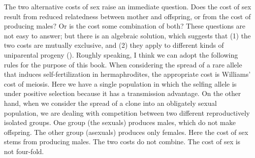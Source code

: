 \documentclass[
  american,
  letterpaper,
]{book}
\begin{document}
The two alternative costs of sex raise an immediate question. Does the
cost of sex result from reduced relatedness between mother and
offspring, or from the cost of producing males? Or is the cost some
combination of both? These questions are not easy to answer; but there
is an algebraic solution, which suggests that (1) the two costs are
mutually exclusive, and (2) they apply to different kinds of uniparental
progeny (). Roughly
speaking, I think we can adopt the following rules for the purpose of
this book. When considering the spread of a rare allele that induces
self-fertilization in hermaphrodites, the appropriate cost is Williams'
cost of meiosis. Here we have a single population in which the selfing
allele is under positive selection because it has a transmission
advantage. On the other hand, when we consider the spread of a clone
into an obligately sexual population, we are dealing with competition
between two different reproductively isolated groups. One group (the
sexuals) produces males, which do not make offspring. The other group
(asexuals) produces only females. Here the cost of sex stems from
producing males. The two costs do not combine. The cost of sex is not
four-fold.
\end{document}
